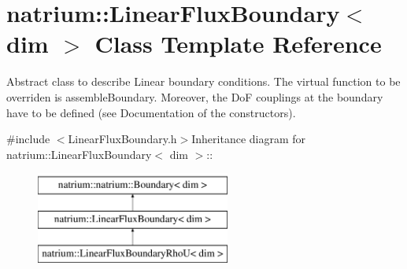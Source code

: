 \hypertarget{classnatrium_1_1LinearFluxBoundary}{
\section{natrium::LinearFluxBoundary$<$ dim $>$ Class Template Reference}
\label{classnatrium_1_1LinearFluxBoundary}
}


Abstract class to describe Linear boundary conditions. The virtual function to be overriden is assembleBoundary. Moreover, the DoF couplings at the boundary have to be defined (see Documentation of the constructors).  


{\ttfamily \#include $<$LinearFluxBoundary.h$>$}Inheritance diagram for natrium::LinearFluxBoundary$<$ dim $>$::\begin{figure}[H]
\begin{center}
\leavevmode
\includegraphics[height=3cm]{classnatrium_1_1LinearFluxBoundary}
\end{center}
\end{figure}
